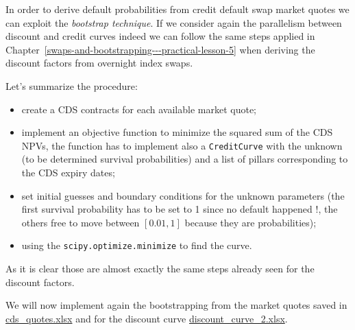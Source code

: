 In order to derive default probabilities from credit default swap market quotes we can exploit the \emph{bootstrap technique}. If we consider again the parallelism between discount and credit curves indeed we can follow the same steps applied in Chapter~\ref{swaps-and-bootstrapping---practical-lesson-5} when deriving the discount factors from overnight index swaps.

Let's summarize the procedure: 
\begin{itemize}
\tightlist
\item create a CDS contracts for each available market quote;
\item implement an objective function to minimize the squared sum of the CDS
	NPVs, the function has to implement also a \texttt{CreditCurve} with
	the unknown (to be determined survival probabilities) and a list of pillars corresponding to the CDS expiry dates;
\item set initial guesses and boundary conditions for the
	unknown parameters (the first survival probability has to be set to 1
	since no default happened !, the others free to move between $[0.01, 1]$ because they are probabilities);
\item using the \texttt{scipy.optimize.minimize} to find the curve.
\end{itemize}

As it is clear those are almost exactly the same steps already seen for the discount factors.

We will now implement again the bootstrapping from the market quotes saved in \href{https://drive.google.com/file/d/1BOtwCFYk0CUwYkMhnowWTj0HNOpBefd_/view?usp=sharing}{cds\_quotes.xlsx} and for the discount curve \href{}{discount\_curve\_2.xlsx}.

